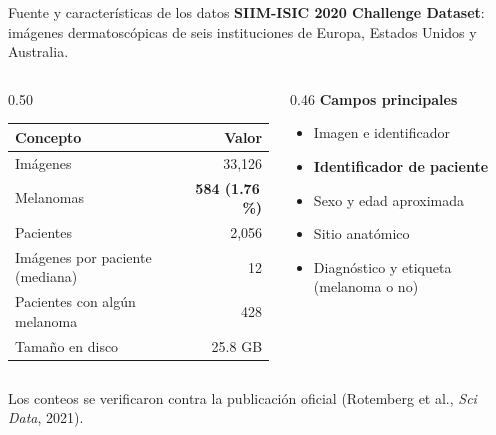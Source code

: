 \documentclass[aspectratio=169,10pt]{beamer}
\begin{document}
\begin{frame}{Fuente y características de los datos}
  \textbf{SIIM-ISIC 2020 Challenge Dataset}: imágenes dermatoscópicas de seis instituciones de Europa, Estados Unidos y Australia.
  \vspace{0.8em}
  \begin{columns}[T]
    \begin{column}{0.50\textwidth}
      \small
      \begin{tabular}{lr}
        \toprule
        \textbf{Concepto} & \textbf{Valor} \\
        \midrule
        Imágenes & 33,126 \\
        Melanomas & \textbf{584 (1.76\,\%)} \\
        Pacientes & 2,056 \\
        Imágenes por paciente (mediana) & 12 \\
        Pacientes con algún melanoma & 428 \\
        Tamaño en disco & 25.8 GB \\
        \bottomrule
      \end{tabular}
    \end{column}
    \begin{column}{0.46\textwidth}
      \textbf{Campos principales}
      \begin{itemize}
        \item Imagen e identificador
        \item \textbf{Identificador de paciente}
        \item Sexo y edad aproximada
        \item Sitio anatómico
        \item Diagnóstico y etiqueta (melanoma o no)
      \end{itemize}
    \end{column}
  \end{columns}
  \vspace{0.6em}
  \begin{center}
    \small Los conteos se verificaron contra la publicación oficial (Rotemberg et al., \textit{Sci Data}, 2021).
  \end{center}
\end{frame}
\end{document}
